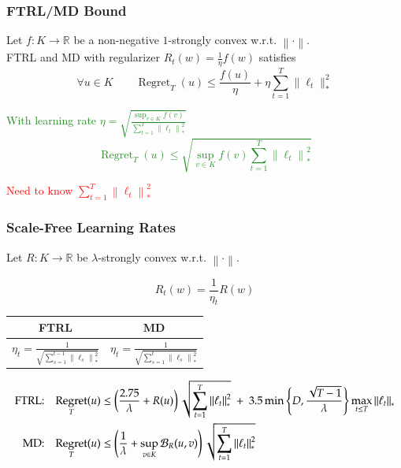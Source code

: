 \documentclass[usenames,dvipsnames]{beamer}
\DeclareMathOperator{\Regret}{Regret}
\newcommand{\R}{\mathbb{R}}
\newcommand{\norm}[1]{\left\|#1\right\|}
\newcommand{\Breg}{\mathcal{B}}
\begin{document}
\begin{frame}
\frametitle{FTRL/MD Bound}

\begin{theorem}[\textcolor{Blue}{CBL'06, SS'11}]
Let $f:K \to \R$ be a non-negative $1$-strongly convex w.r.t. $\norm{\cdot}$. \\
FTRL and MD with regularizer $R_t(w) = \frac{1}{\eta} f(w)$ satisfies
$$
\forall u \in K \qquad  \Regret_T(u) \le \frac{f(u)}{\eta} + \eta \sum_{t=1}^T \|\ell_t\|_*^2
$$
\end{theorem}

\pause
\textcolor{ForestGreen}{
With learning rate $\eta = \sqrt{\frac{\sup_{v \in K} f(v)}{\sum_{t=1}^T \norm{\ell_t}_*^2}}$
$$
\Regret_T(u) \le \sqrt{\sup_{v \in K} f(v) \sum_{t=1}^T \norm{\ell_t}_*^2}
$$}

\pause
\textcolor{red}{Need to know $\sum_{t=1}^T \norm{\ell_t}_*^2$}
\end{frame}

\begin{frame}
\frametitle{Scale-Free Learning Rates}
Let $R:K \to \R$ be $\lambda$-strongly convex w.r.t. $\norm{\cdot}$.

\vspace{0.2cm}

\begin{minipage}{4cm}
$$
R_t(w) = \frac{1}{\eta_t} R(w)
$$
\end{minipage}
%
\begin{minipage}{5cm}
\begin{center}
\def\arraystretch{2}%
\everymath{\displaystyle}
\begin{tabular}{c|c}
FTRL & MD \\ \hline
$\eta_t = \frac{1}{\sqrt{\sum_{s=1}^{t-1} \norm{\ell_s}_*^2}}$ &  $\eta_t = \frac{1}{\sqrt{\sum_{s=1}^t \norm{\ell_s}_*^2}}$ \\
\end{tabular}
\end{center}
\end{minipage}

\pause

\vspace{0.5cm}

\begin{center}
\fontsize{8.5pt}{10}\selectfont
\begin{align*}
\textsc{FTRL:} & & \Regret_T(u) & \le \left( \frac{2.75}{\lambda} + R(u)\right) \sqrt{\sum_{t=1}^T \norm{\ell_t}_*^2} \ + \ 3.5 \min \left\{ D, \frac{\sqrt{T-1}}{\lambda} \right\} \max_{t \le T} \norm{\ell_t}_* \\
\textsc{MD:} & & \Regret_T(u) & \le \left( \frac{1}{\lambda} + \sup_{v \in K} \Breg_{R}(u,v) \right) \sqrt{\sum_{t=1}^T \norm{\ell_t}_*^2}
\end{align*}
\end{center}

\end{frame}
\end{document}
